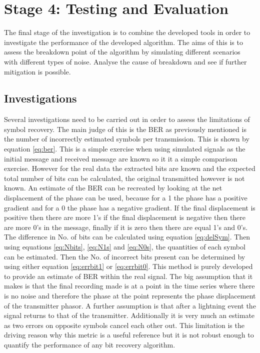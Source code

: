 \section{Stage 4: Testing and Evaluation}
The final stage of the investigation is to combine the developed tools in order to investigate the performance of the developed algorithm. The aims of this is to assess the breakdown point of the algorithm by simulating different scenarios with different types of noise. Analyse the cause of breakdown and see if further mitigation is possible.
\subsection{Investigations}\label{sec:investigations}
Several investigations need to be carried out in order to assess the limitations of symbol recovery. The main judge of this is the BER as previously mentioned is the number of incorrectly estimated symbols per transmission. This is shown by equation \ref{eq:ber}. This is a simple exercise when using simulated signals as the initial message and received message are known so it it a simple comparison exercise. However for the real data the extracted bits are known and the expected total number of bits can be calculated, the original transmitted however is not known. An estimate of the BER can be recreated by looking at the net displacement of the phase can be used, because for a 1 the phase has a positive gradient and for a 0 the phase has a negative gradient. If the final displacement is positive then there are more 1's if the final displacement is negative then there are more 0's in the message, finally if it is zero then there are equal 1's and 0's. The difference in No. of bits can be calculated using equation \ref{eq:delSym}. Then using equations \ref{eq:Nbits}, \ref{eq:N1s} and \ref{eq:N0s}, the quantities of each symbol can be estimated. Then the No. of incorrect bits present can be determined by using either equation \ref{eq:errbit1} or \ref{eq:errbit0}. This method is purely developed to provide an estimate of BER within the real signal. The big assumption that it makes is that the final recording made is at a point in the time series where there is no noise and therefore the phase at the point represents the phase displacement of the transmitter phasor. A further assumption is that after a lightning event the signal returns to that of the transmitter. Additionally it is very much an estimate as two errors on opposite symbols cancel each other out. This limitation is the driving reason why this metric is a useful reference but it is not robust enough to quantify the performance of any bit recovery algorithm. 
